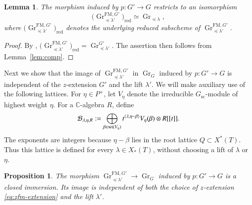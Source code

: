 \documentclass[a4paper, 12pt]{amsart}
\newtheorem{lemma}[theorem]{Lemma}
\newtheorem{proposition}[theorem]{Proposition}
\theoremstyle{definition}
\newcommand{\C}{\mathbb C}
\DeclareMathOperator{\Gr}{\mathrm{Gr}}
\begin{document}
\begin{lemma}\label{lem:FM_red}
The morphism induced by $p:G'\to G$ restricts to an isomorphism
\[
\bigl(\Gr^{\mathrm{FM},G'}_{\preceq\lambda'}\bigr)_{\mathrm{red}} \simeq  \Gr_{\preceq\lambda},
\]
where $\bigl(\Gr^{\mathrm{FM},G'}_{\preceq\lambda'}\bigr)_{\mathrm{red}}$ denotes the underlying reduced subscheme of
$\Gr^{\mathrm{FM},G'}_{\preceq\lambda'}$.
\end{lemma}

\begin{proof}
By \cite[Propositions~2.1.4--2.1.5 and Remark~2.1.7]{ZhuPCMI}, $\bigl(\Gr^{\mathrm{FM},G'}_{\preceq\lambda'}\bigr)_{\mathrm{red}} =\Gr^{G'}_{\preceq\lambda'}$.
The assertion then follows from Lemma~\ref{lem:comp}.
\end{proof}

Next we show that the image of $\Gr_{\preceq \lambda'}^{\mathrm{FM}, G'}$ in $\Gr_G$ induced by $p: G' \rightarrow G$ is independent of the $z$-extension $G'$ and the lift $\lambda'$. We will make auxiliary use of the following lattices.
For $\eta\in P^+$, let $V_\eta$ denote the irreducible
$G_{\mathrm{sc}}$-module of highest weight $\eta$. For a $\C$-algebra $R$, define
\begin{equation}\label{eq:zfm-intrinsic-lattice}
\mathcal B_{\lambda,\eta,R}
:=
\bigoplus_{\beta\in{\rm wt}(V_\eta)}
 t^{\langle\lambda,\eta-\beta\rangle}
 V_\eta(\beta)\otimes R[[t]].
\end{equation}
The exponents are integers because $\eta-\beta$ lies in the root lattice
$Q\subset X^*(T)$. Thus this lattice is defined for every
$\lambda\in X_*(T)$, without choosing a lift of $\lambda$ or $\eta$.

\begin{proposition}\label{prop:zfm-independence}
The morphism $\Gr^{\mathrm{FM},G'}_{\preceq\lambda'}\to\Gr_G$
induced by $p:G'\to G$ is a closed immersion. Its image is independent of
both the choice of $z$-extension \eqref{eq:zfm-extension} and the lift
$\lambda'$.
\end{proposition}
\end{document}
